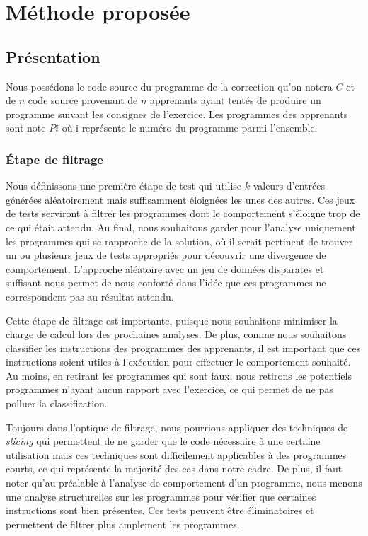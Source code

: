 \section{Méthode proposée}

\subsection{Présentation}
Nous possédons le code source du programme de la correction qu'on notera $C$ et de $n$ code source provenant de $n$ apprenants ayant tentés de produire un programme suivant les consignes de l'exercice. Les programmes des apprenants sont note $Pi$ où i représente le numéro du programme parmi l'ensemble.

\subsubsection*{Étape de filtrage}
Nous définissons une première étape de test qui utilise $k$ valeurs d'entrées générées aléatoirement mais suffisamment éloignées les unes des autres. Ces jeux de tests serviront à filtrer les programmes dont le comportement s'éloigne trop de ce qui était attendu. 
Au final, nous souhaitons garder pour l'analyse uniquement les programmes qui se rapproche de la solution, où il serait pertinent de trouver un ou plusieurs jeux de tests appropriés pour découvrir une divergence de comportement. 
L'approche aléatoire avec un jeu de données disparates et suffisant nous permet de nous conforté dans l'idée que ces programmes ne correspondent pas au résultat attendu.

Cette étape de filtrage est importante, puisque nous souhaitons minimiser la charge de calcul lors des prochaines analyses. De plus, comme nous souhaitons classifier les instructions des programmes des apprenants, il est important que ces instructions soient utiles à l'exécution pour effectuer le comportement souhaité. Au moins, en retirant les programmes qui sont faux, nous retirons les potentiels programmes n'ayant aucun rapport avec l'exercice, ce qui permet de ne pas polluer la classification. 

Toujours dans l'optique de filtrage, nous pourrions appliquer des techniques de \textit{slicing} qui permettent de ne garder que le code nécessaire à une certaine utilisation mais ces techniques sont difficilement applicables à des programmes courts, ce qui représente la majorité des cas dans notre cadre. 
De plus, il faut noter qu'au préalable à l'analyse de comportement d'un programme, nous menons une analyse structurelles sur les programmes pour vérifier que certaines instructions sont bien présentes. Ces tests peuvent être éliminatoires et permettent de filtrer plus amplement les programmes.

